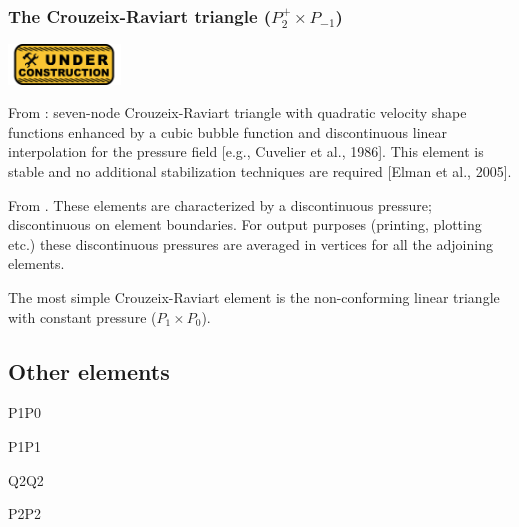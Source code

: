 \subsubsection{The Crouzeix-Raviart triangle ($P_2^+\times P_{-1}$)}
\includegraphics[width=3cm]{images/under_construction}

From \cite{daks08}: seven-node Crouzeix-Raviart triangle with quadratic velocity shape functions enhanced by a cubic bubble function and discontinuous linear interpolation for the pressure field [e.g., Cuvelier et al., 1986]. This element is stable and no additional stabilization techniques are required [Elman et al., 2005].

From \cite{segal}. These elements are characterized by a discontinuous pressure; 
discontinuous on element boundaries. 
For output purposes (printing, plotting etc.) these discontinuous pressures are averaged 
in vertices for all the adjoining elements.

The most simple Crouzeix-Raviart element is the non-conforming linear triangle 
with constant pressure ($P_1\times P_0$).



\subsection{Other elements}

P1P0

P1P1

Q2Q2

P2P2

